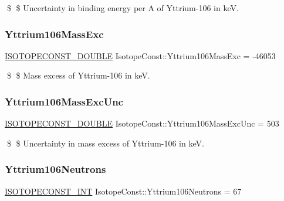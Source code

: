 \$ \$ Uncertainty in binding energy per A of Yttrium-\/106 in keV. \mbox{\label{group___isotope_const-_yttrium-_y106_gae8d3898792dc9829cc01ca949208cb36}} 
\subsubsection{\texorpdfstring{Yttrium106\+Mass\+Exc}{Yttrium106MassExc}}
{\footnotesize\ttfamily \mbox{\hyperlink{group___isotope_const-_macros_ga8f45a7272ce02c0b4c65c44636ed719a}{I\+S\+O\+T\+O\+P\+E\+C\+O\+N\+S\+T\+\_\+\+D\+O\+U\+B\+LE}} Isotope\+Const\+::\+Yttrium106\+Mass\+Exc = -\/46053}

\$ \$ Mass excess of Yttrium-\/106 in keV. \mbox{\label{group___isotope_const-_yttrium-_y106_ga20e7aad808b8536e278298c6eaad09f7}} 
\subsubsection{\texorpdfstring{Yttrium106\+Mass\+Exc\+Unc}{Yttrium106MassExcUnc}}
{\footnotesize\ttfamily \mbox{\hyperlink{group___isotope_const-_macros_ga8f45a7272ce02c0b4c65c44636ed719a}{I\+S\+O\+T\+O\+P\+E\+C\+O\+N\+S\+T\+\_\+\+D\+O\+U\+B\+LE}} Isotope\+Const\+::\+Yttrium106\+Mass\+Exc\+Unc = 503}

\$ \$ Uncertainty in mass excess of Yttrium-\/106 in keV. \mbox{\label{group___isotope_const-_yttrium-_y106_ga95550d82889a9d3f98dafb8ee2664cea}} 
\subsubsection{\texorpdfstring{Yttrium106\+Neutrons}{Yttrium106Neutrons}}
{\footnotesize\ttfamily \mbox{\hyperlink{group___isotope_const-_macros_ga5f18360b3e99483a35c32d789e62621c}{I\+S\+O\+T\+O\+P\+E\+C\+O\+N\+S\+T\+\_\+\+I\+NT}} Isotope\+Const\+::\+Yttrium106\+Neutrons = 67}

